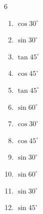 \begin{multicols}{6}
\begin{enumerate}
        \phantom{$\displaystyle =1$}

  \item $\displaystyle \cos{30^\circ}$


  \item $\displaystyle \sin{30^\circ}$


  \item $\displaystyle \tan{45^\circ}$

        \phantom{$\displaystyle =1$}

  \item $\displaystyle \cos{45^\circ}$


  \item $\displaystyle \tan{45^\circ}$

        \phantom{$\displaystyle =1$}

  \item $\displaystyle \sin{60^\circ}$


  \item $\displaystyle \cos{30^\circ}$


  \item $\displaystyle \cos{45^\circ}$


  \item $\displaystyle \sin{30^\circ}$


  \item $\displaystyle \sin{60^\circ}$


\columnbreak %

  \item $\displaystyle \sin{30^\circ}$


  \item $\displaystyle \sin{45^\circ}$



\end{enumerate}
\end{multicols}
